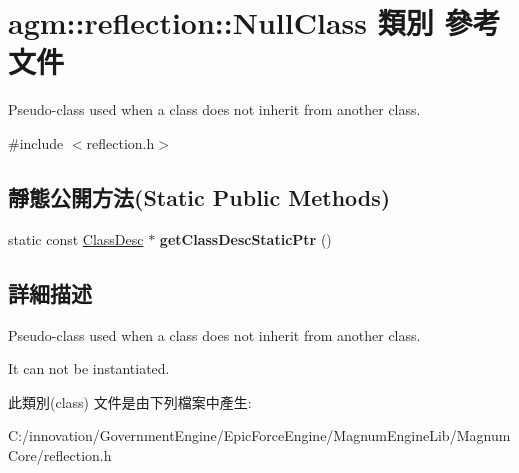\hypertarget{classagm_1_1reflection_1_1_null_class}{}\section{agm\+:\+:reflection\+:\+:Null\+Class 類別 參考文件}
\label{classagm_1_1reflection_1_1_null_class}


Pseudo-\/class used when a class does not inherit from another class.  




{\ttfamily \#include $<$reflection.\+h$>$}

\subsection*{靜態公開方法(Static Public Methods)}
\begin{DoxyCompactItemize}
\item 
static const \hyperlink{classagm_1_1reflection_1_1_class_desc}{Class\+Desc} $\ast$ {\bfseries get\+Class\+Desc\+Static\+Ptr} ()\hypertarget{classagm_1_1reflection_1_1_null_class_a328a9a88e9c7d6f3de248076cd88c2f1}{}\label{classagm_1_1reflection_1_1_null_class_a328a9a88e9c7d6f3de248076cd88c2f1}

\end{DoxyCompactItemize}


\subsection{詳細描述}
Pseudo-\/class used when a class does not inherit from another class. 

It can not be instantiated. 

此類別(class) 文件是由下列檔案中產生\+:\begin{DoxyCompactItemize}
\item 
C\+:/innovation/\+Government\+Engine/\+Epic\+Force\+Engine/\+Magnum\+Engine\+Lib/\+Magnum\+Core/reflection.\+h\end{DoxyCompactItemize}
